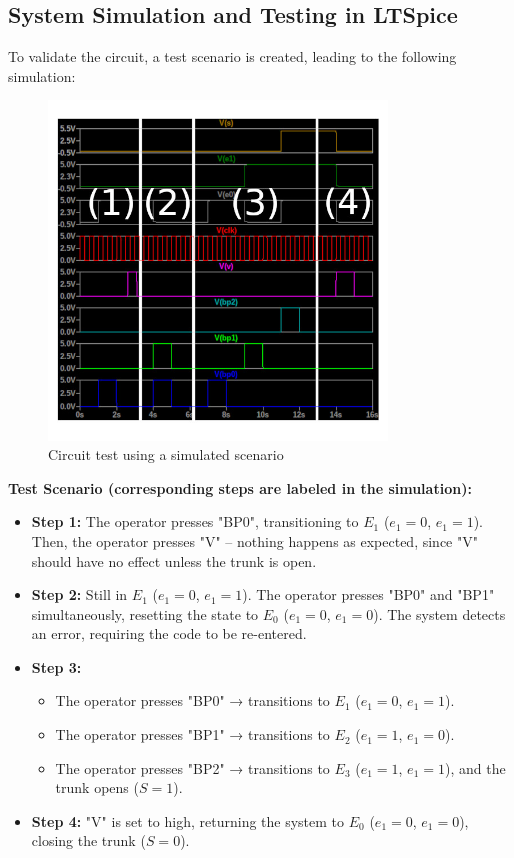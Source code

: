 \newpage
\subsection{System Simulation and Testing in LTSpice}
To validate the circuit, a test scenario is created, leading to the following simulation:

\begin{figure}[H]
\centering
\includegraphics[height=9cm]{img/simu.jpg}
\caption{Circuit test using a simulated scenario}
\end{figure}

\textbf{Test Scenario (corresponding steps are labeled in the simulation):}
\begin{itemize}
    \item \textbf{Step 1:}  
    The operator presses "BP0", transitioning to $E_1$ ($e_1=0$, $e_1=1$).  
    Then, the operator presses "V" – nothing happens as expected, since "V" should have no effect unless the trunk is open.
    
    \item \textbf{Step 2:}  
    Still in $E_1$ ($e_1=0$, $e_1=1$). The operator presses "BP0" and "BP1" simultaneously, resetting the state to $E_0$ ($e_1=0$, $e_1=0$).  
    The system detects an error, requiring the code to be re-entered.
    
    \item \textbf{Step 3:}  
    \begin{itemize}
        \item The operator presses "BP0" → transitions to $E_1$ ($e_1=0$, $e_1=1$).
        \item The operator presses "BP1" → transitions to $E_2$ ($e_1=1$, $e_1=0$).
        \item The operator presses "BP2" → transitions to $E_3$ ($e_1=1$, $e_1=1$), and the trunk opens ($S=1$).
    \end{itemize}
    
    \item \textbf{Step 4:}  
    "V" is set to high, returning the system to $E_0$ ($e_1=0$, $e_1=0$), closing the trunk ($S=0$).
\end{itemize}

